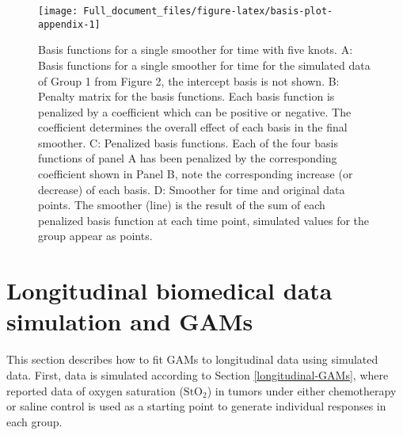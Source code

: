 \documentclass[
]{article}
\begin{document}
\begin{figure}[H]

{\centering \texttt{[image: Full\_document\_files/figure-latex/basis-plot-appendix-1]} 

}

\caption{Basis functions for a single smoother for time with five knots. A: Basis functions for a single smoother for time for the simulated data of Group 1 from Figure 2, the intercept basis is not shown. B: Penalty matrix for the basis functions. Each basis function is penalized by a coefficient which can be positive or negative. The coefficient determines the overall effect of each basis in the final smoother. C: Penalized basis functions. Each of the four basis functions of panel A has been penalized by the corresponding coefficient shown in Panel B, note the corresponding increase (or decrease) of each basis. D: Smoother for time and original data points. The smoother (line) is the result of the sum of each penalized basis function at each time point, simulated values for the group appear as points.}\label{fig:basis-plot-appendix}
\end{figure}

\hypertarget{tumor-data-simulation}{%
\section{Longitudinal biomedical data simulation and GAMs}\label{tumor-data-simulation}}

This section describes how to fit GAMs to longitudinal data using simulated data. First, data is simulated according to Section \ref{longitudinal-GAMs}, where reported data of oxygen saturation (\(\mbox{StO}_2\)) in tumors under either chemotherapy or saline control is used as a starting point to generate individual responses in each group.
\end{document}
